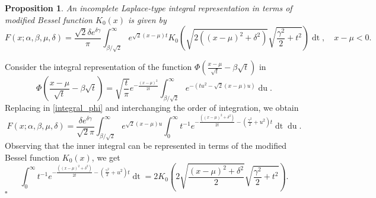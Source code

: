 \documentclass[10pt,a4paper,oneside]{article}
\newtheorem{proposition}[theorem]{Proposition}
\newenvironment{proof}{\noindent{\bf Proof:}}{\hfill$\square$}
\numberwithin{equation}{section}
\begin{document}
\begin{proposition} An incomplete Laplace-type integral representation in terms of modified Bessel function $K_0(x)$ is given by
\begin{equation}\label{integral_k0}
F(x; \alpha, \beta, \mu, \delta) = \frac{\sqrt{2}\delta e^{\delta \gamma}}{\pi}\int_{\beta / \sqrt{2}}^{\infty} e^{\sqrt{2}(x-\mu)t} K_0\left(\sqrt{2\left( (x-\mu)^2 + \delta^2\right)} \sqrt{\frac{\gamma^2}{2} + t^2}\right) \mathop{dt}, \quad x - \mu < 0.
\end{equation}
\end{proposition}
\begin{proof}
Consider the integral representation of the function $\Phi\left(\frac{x-\mu}{\sqrt{t}} -\beta \sqrt{t} \right)$ in \cite[\S 7.7]{NIST:DLMF}
\begin{equation*}
\Phi\left(\frac{x-\mu}{\sqrt{t}} -\beta \sqrt{t} \right) = \sqrt{\frac{t}{\pi}} e^{-\frac{(x-\mu)^2}{2t}}\int_{\beta/\sqrt{2}}^{\infty} e^{-(tu^2 - \sqrt{2}(x-\mu) u)} \mathop{du}.
\end{equation*}
Replacing in \eqref{integral_phi} and interchanging the order of integration, we obtain
\begin{equation*}
F(x; \alpha, \beta, \mu, \delta) = \frac{\delta e^{\delta \gamma}}{\sqrt{2}\pi} \int_{\beta/\sqrt{2}}^{\infty} e^{\sqrt{2}(x-\mu) u} \int_{0}^{\infty} t^{-1} e^{-\frac{\left((x-\mu)^2 + \delta^2\right)}{2t} - \left(\frac{\gamma^2}{2} + u^2\right)t} \mathop{dt} \mathop{du}.
\end{equation*}
Observing that the inner integral can be represented in terms of the modified Bessel function $K_0(x)$, we get
\begin{equation*}
\int_{0}^{\infty} t^{-1} e^{-\frac{\left((x-\mu)^2 + \delta^2\right)}{2t} - \left(\frac{\gamma^2}{2} + u^2\right)t} \mathop{dt} = 2 K_0\left(2\sqrt{\frac{(x-\mu)^2 + \delta^2}{2}} \sqrt{\frac{\gamma^2}{2} + t^2}\right).
\end{equation*}
\end{proof}
\end{document}
